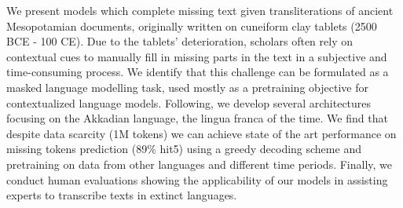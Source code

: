 We present models which complete missing text given transliterations of ancient Mesopotamian documents, originally written on cuneiform clay tablets (2500 BCE - 100 CE). Due to the tablets' deterioration, scholars often rely on contextual cues to manually fill in missing parts in the text in a subjective and time-consuming process. We identify that this challenge can be formulated as a masked language modelling task, used mostly as a pretraining objective for contextualized language models. Following, we develop several architectures focusing on the Akkadian language, the lingua franca of the time. We find that despite data scarcity (1M tokens) we can achieve state of the art performance on missing tokens prediction (89\% hit\@5) using a greedy decoding scheme and pretraining on data from other languages and different time periods. Finally, we conduct human evaluations showing the applicability of our models in assisting experts to transcribe texts in extinct languages.
